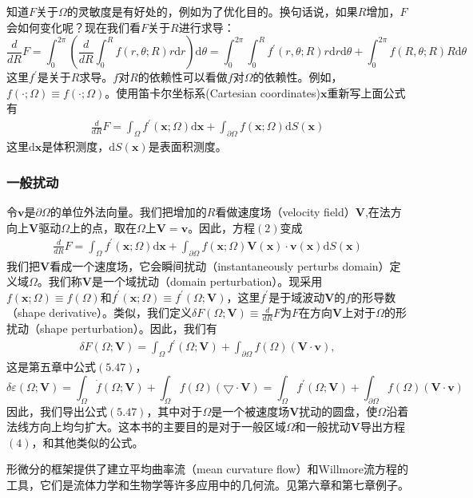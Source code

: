 \documentclass[12pt,a4paper]{article}
\begin{document}
知道$F$关于$\Omega$的灵敏度是有好处的，例如为了优化目的。换句话说，如果$R$增加，$F$会如何变化呢？现在我们看$F$关于$R$进行求导：
$$\frac{d}{dR}F=\int_{0}^{2\pi}\left( \frac{d}{dR}\int_{0}^{R}f(r,\theta;R)r\mathrm{d}r \right)\mathrm{d}\theta =\int_{0}^{2\pi}\int_{0}^{R}f^{'}(r,\theta;R)r\mathrm{d}r\mathrm{d}\theta + \int_{0}^{2\pi}f(R,\theta;R)R\mathrm{d}\theta$$
这里$f^{'}$是关于$R$求导。$f$对$R$的依赖性可以看做$f$对$\Omega$的依赖性。例如，$f(\cdot;\Omega)\equiv f(\cdot;\Omega)$。使用笛卡尔坐标系(Cartesian coordinates)$\mathbf{x}$重新写上面公式有
\begin{equation}
\begin{aligned}
\frac{d}{dR}F=\int_{\Omega}f^{'}(\mathbf{x};\Omega)\mathrm{d}\mathbf{x} + \int_{\partial \Omega}f(\mathbf{x};\Omega)\mathrm{d}S(\mathbf{x})
\end{aligned}
\end{equation}
这里$\mathrm{d}\mathbf{x}$是体积测度，$\mathrm{d}S(\mathbf{x})$是表面积测度。

\subsubsection{一般扰动}
令$\boldsymbol{v}$是$\partial \Omega$的单位外法向量。我们把增加的$R$看做速度场（velocity field）$\mathbf{V}$,在法方向上$\mathbf{V}$驱动$\Omega$上的点，取在$\Omega$上$\mathbf{V}=\boldsymbol{v}$。因此，方程$(2)$变成
\begin{equation}
\begin{aligned}
\frac{d}{dR}F=\int_{\Omega}f^{'}(\mathbf{x};\Omega)\mathrm{d}\mathbf{x} + \int_{\partial \Omega}f(\mathbf{x};\Omega)\mathbf{V}(\mathbf{x})\cdot \boldsymbol{v}(\mathbf{x})\mathrm{d}S(\mathbf{x})
\end{aligned}
\end{equation}
我们把$\mathbf{V}$看成一个速度场，它会瞬间扰动（instantaneously perturbs domain）定义域$\Omega$。我们称$\mathbf{V}$是一个域扰动（domain perturbation）。现采用$f(\mathbf{x};\Omega)\equiv f(\Omega)$和$f^{'}(\mathbf{x};\Omega)\equiv f^{'}(\Omega;\mathbf{V})$，这里$f^{'}$是于域波动$\mathbf{V}$的$f$的形导数（shape derivative）。类似，我们定义$\delta F(\Omega;\mathbf{V})\equiv \frac{d}{dR}F$为$F$在方向$\mathbf{V}$上对于$\Omega$的形扰动（shape perturbation）。因此，我们有
\begin{equation}
\begin{aligned}
\delta F(\Omega;\mathbf{V})=\int_{\Omega}f^{'}(\Omega;\mathbf{V})+\int_{\partial \Omega}f(\Omega)(\mathbf{V} \cdot \boldsymbol{v}),
\end{aligned}
\end{equation}
这是第五章中公式$(5.47)$，
$$\delta \varepsilon (\Omega;\mathbf{V})=\int_{\Omega}\dot{f}(\Omega;\mathbf{V})+\int_{\Omega}f(\Omega)(\bigtriangledown \cdot \mathbf{V})=\int_{\Omega}f^{'}(\Omega;\mathbf{V})+\int_{\partial \Omega}f(\Omega)(\mathbf{V} \cdot \boldsymbol{v})$$因此，我们导出公式$(5.47)$，其中对于$\Omega$是一个被速度场$\mathbf{V}$扰动的圆盘，使$\Omega$沿着法线方向上均匀扩大。这本书的主要目的是对于一般区域$\Omega$和一般扰动$\mathbf{V}$导出方程$(4)$，和其他类似的公式。

形微分的框架提供了建立平均曲率流（mean curvature flow）和Willmore流方程的工具，它们是流体力学和生物学等许多应用中的几何流。见第六章和第七章例子。








\nocite{*}
\cite{tam19912d}
%
\end{document}
